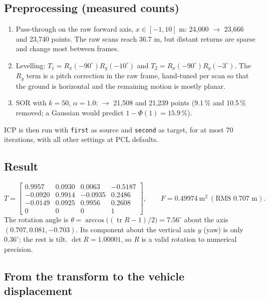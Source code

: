 \documentclass[10pt,a4paper]{scrartcl}
\renewcommand{\emph}[1]{\textcolor{accent}{#1}}
\newcommand{\code}[1]{\texttt{#1}}
\DeclareMathOperator{\tr}{tr}
\begin{document}
  \subsection{Preprocessing (measured counts)}

  \begin{enumerate}
    \item Pass-through on the raw forward axis, $x\in[-1,10]$ m: 24,000 $\to$ 23,666 and
      23,740 points. The raw scans reach 36.7 m, but distant returns are sparse and
      change most between frames.
    \item Levelling: $T_1=R_x(-90^\circ)R_y(-10^\circ)$ and $T_2=R_x(-90^\circ)R_y(-3^\circ)$.
      The $R_y$ term is a \emph{pitch} correction in the raw frame, hand-tuned per scan so
      that the ground is horizontal and the remaining motion is mostly planar.
    \item SOR with $k=50$, $\alpha=1.0$: $\to$ 21,508 and 21,239 points (9.1\,\% and
      10.5\,\% removed; a Gaussian would predict $1-\Phi(1)=15.9\,\%$).
  \end{enumerate}
  ICP is then run with \code{first} as source and \code{second} as target, for at
  most 70 iterations, with all other settings at PCL defaults.

  \subsection{Result}

  \begin{equation}
    T=\begin{bmatrix}
      0.9957 & 0.0930 & 0.0063 & -0.5187\\
     -0.0920 & 0.9914 & -0.0935 & 0.2486\\
     -0.0149 & 0.0925 & 0.9956 & 0.2608\\
      0&0&0&1\end{bmatrix},
    \qquad F=0.49974\ \text{m}^2\ (\text{RMS }0.707\text{ m}).
  \end{equation}
  The rotation angle is $\theta=\arccos\big((\tr R-1)/2\big)=7.56^\circ$ about the
  axis $(0.707,0.081,-0.703)$. Its component about the vertical axis $y$ (yaw) is
  only $0.36^\circ$; the rest is tilt. $\det R=1.00001$, so $R$ is a valid rotation to
  numerical precision.

  \subsection{From the transform to the vehicle displacement}
\end{document}
